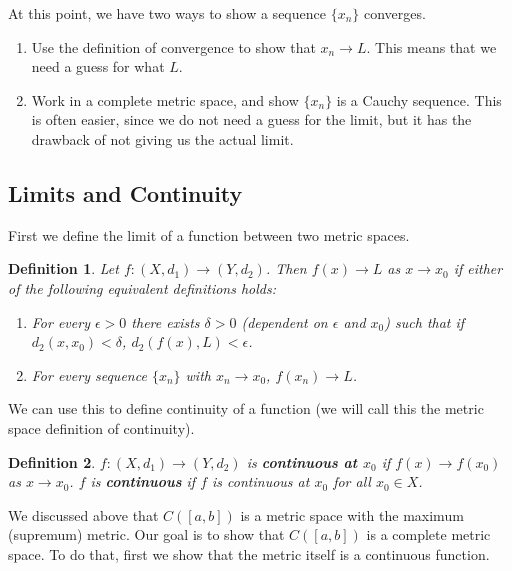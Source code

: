 \documentclass[12pt]{amsart}         %
\newtheorem{definition}{Definition}[section]
\theoremstyle{remark}
\begin{document}
At this point, we have two ways to show a sequence $\{x_n\}$ converges.
\begin{enumerate}
    \item Use the definition of convergence to show that $x_n \rightarrow L$. This means that we need a guess for what $L$.
    \item Work in a complete metric space, and show $\{x_n\}$ is a Cauchy sequence. This is often easier, since we do not need a guess for the limit, but it has the drawback of not giving us the actual limit.
\end{enumerate}

\subsection{Limits and Continuity}

First we define the limit of a function between two metric spaces. 

\begin{definition}Let $f: (X, d_1) \rightarrow (Y, d_2)$. Then $f(x) \rightarrow L$ as $x \rightarrow x_0$ if either of the following equivalent definitions holds:
\begin{enumerate}
\item For every $\epsilon > 0$ there exists $\delta > 0$ (dependent on $\epsilon$ and $x_0$) such that if $d_2(x, x_0) < \delta$, $d_2(f(x), L) < \epsilon$.
\item For every sequence $\{x_n\}$ with $x_n \rightarrow x_0$, $f(x_n) \rightarrow L$.
\end{enumerate}
\end{definition}

We can use this to define continuity of a function (we will call this the metric space definition of continuity).

\begin{definition}
$f : (X, d_1) \rightarrow (Y, d_2)$ is \textbf{continuous at $x_0$} if $f(x) \rightarrow f(x_0)$ as $x \rightarrow x_0$. $f$ is \textbf{continuous} if $f$ is continuous at $x_0$ for all $x_0 \in X$.
\end{definition}

We discussed above that $C([a,b])$ is a metric space with the maximum (supremum) metric. Our goal is to show that $C([a,b])$ is a complete metric space. To do that, first we show that the metric itself is a continuous function.
\end{document}
